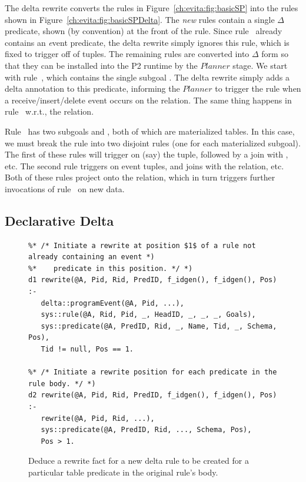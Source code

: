 The delta rewrite converts the rules in Figure~\ref{ch:evita:fig:basicSP} into
the rules shown in Figure~\ref{ch:evita:fig:basicSPDelta}.  The {\em new} rules
contain a single $\Delta$ predicate, shown (by convention) at the front of the
rule.  Since rule~ already contains an {\emph event} predicate, the
delta rewrite simply ignores this rule, which is fixed to trigger off of
 tuples.  The remaining rules are converted into $\Delta$ form
so that they can be installed into the P2 runtime by the $Planner$ stage.  We
start with rule~, which contains the single subgoal .  The
delta rewrite simply adds a delta annotation to this predicate, informing the
$Planner$ to trigger the rule when a receive/insert/delete event occurs on the
 relation.  The same thing happens in rule~ w.r.t., the
 relation.

Rule~ has two subgoals  and , both of which are
materialized tables.  In this case, we must break the rule into two disjoint
rules (one for each materialized subgoal).  The first of these rules will
trigger on (say) the  tuple, followed by a join with , etc.
The second rule triggers on  event tuples, and joins with the
 relation, etc.  Both of these rules project onto the 
relation, which in turn triggers further invocations of rule~ on new
 data.

\subsection{Declarative Delta}

\begin{figure}[!t]
\ssp
\centering
\begin{lstlisting}
%* /* Initiate a rewrite at position $1$ of a rule not already containing an event *)
%*    predicate in this position. */ *)
d1 rewrite(@A, Pid, Rid, PredID, f_idgen(), f_idgen(), Pos) :-
   delta::programEvent(@A, Pid, ...), 
   sys::rule(@A, Rid, Pid, _, HeadID, _, _, _, Goals),
   sys::predicate(@A, PredID, Rid, _, Name, Tid, _, Schema, Pos),
   Tid != null, Pos == 1.

%* /* Initiate a rewrite position for each predicate in the rule body. */ *)
d2 rewrite(@A, Pid, Rid, PredID, f_idgen(), f_idgen(), Pos) :-
   rewrite(@A, Pid, Rid, ...),
   sys::predicate(@A, PredID, Rid, ..., Schema, Pos),
   Pos > 1.
\end{lstlisting}
\caption{\label{ch:evita:fig:delta1}Deduce a rewrite fact for a new delta rule to be
created for a particular table predicate in the original rule's body.}
\end{figure}

